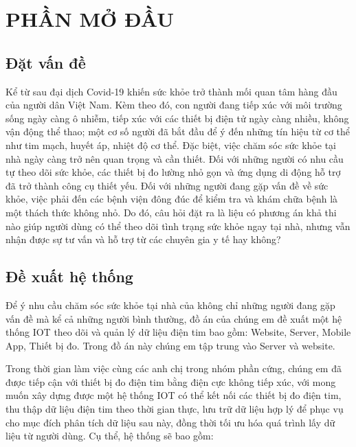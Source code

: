 
\section*{PHẦN MỞ ĐẦU}
\subsection*{Đặt vấn đề} 

Kể từ sau đại dịch Covid-19 khiến sức khỏe trở thành mối quan tâm hàng đầu của người dân Việt Nam. Kèm theo đó, con người đang tiếp xúc với môi trường sống ngày càng ô nhiễm, 
tiếp xúc với các thiết bị điện tử ngày càng nhiều, không vận động thể thao; một cơ số người đã bắt đầu để ý đến những tín hiệu từ cơ thể như tim mạch, huyết áp, nhiệt độ cơ thể.
Đặc biệt, việc chăm sóc sức khỏe tại nhà ngày càng trở nên quan trọng và cần thiết. 
Đối với những người có nhu cầu tự theo dõi sức khỏe, các thiết bị đo lường nhỏ gọn và ứng dụng di động hỗ trợ đã trở thành công cụ thiết yếu. 
Đối với những người đang gặp vấn đề về sức khỏe, việc phải đến các bệnh viện đông đúc để kiểm tra và khám chữa bệnh là một thách thức không nhỏ. 
Do đó, câu hỏi đặt ra là liệu có phương án khả thi nào giúp người dùng có thể theo dõi tình trạng sức khỏe ngay tại nhà, 
nhưng vẫn nhận được sự tư vấn và hỗ trợ từ các chuyên gia y tế hay không?

\subsection*{Đề xuất hệ thống}

Để ý nhu cầu chăm sóc sức khỏe tại nhà của không chỉ những người đang gặp vấn đề mà kể cả những người bình thường, đồ án của chúng em đề xuất một hệ thống IOT
theo dõi và quản lý dữ liệu điện tim bao gồm: Website, Server, Mobile App, Thiết bị đo. Trong đồ án này chúng em tập trung vào Server và website.

Trong thời gian làm việc cùng các anh chị trong nhóm phần cứng, chúng em đã được tiếp cận với thiết bị đo điện tim bằng điện cực không tiếp xúc, 
với mong muốn xây dựng được một hệ thống IOT có thể kết nối các thiết bị đo điện tim, thu thập dữ liệu điện tim theo thời gian thực, lưu trữ dữ liệu hợp lý
để phục vụ cho mục đích phân tích dữ liệu sau này, đồng thời tối ưu hóa quá trình lấy dữ liệu từ người dùng.
Cụ thể, hệ thống sẽ bao gồm:

